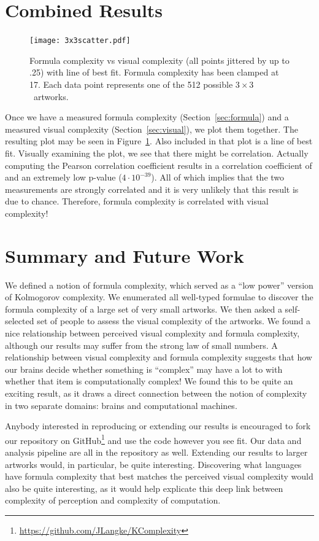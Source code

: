 \documentclass[11pt]{article}
\newcommand{\threexthree}{$3\times3$}
\begin{document}



\section{Combined Results}

\begin{figure}
\texttt{[image: 3x3scatter.pdf]}

\caption{Formula complexity vs visual complexity  (all points jittered by up to .25) with line of best fit.  Formula complexity has been clamped at 17.  Each data point represents one of the 512 possible \threexthree\ artworks.}
\label{fig:scatter}
\end{figure}

Once we have a measured formula complexity (Section~\ref{sec:formula}) and a
measured visual complexity (Section~\ref{sec:visual}), we plot them together.
The resulting plot may be seen in Figure~\ref{fig:scatter}.  Also included in
that plot is a line of best fit.  Visually examining the plot, we see that
there might be correlation.  Actually computing the Pearson correlation
coefficient results in a correlation coefficient of 
and an extremely low p-value ($4\cdot10^{-39}$).  All of which implies that the
two measurements are strongly correlated and it is very unlikely that this
result is due to chance.  Therefore, formula complexity is correlated with visual complexity! 

\section{Summary and Future Work}

We defined a notion of formula complexity, which served as a ``low power''
version of Kolmogorov complexity.  We enumerated all well-typed formulae to
discover the formula complexity of a large set of very small artworks.  We then
asked a self-selected set of people to assess the visual complexity of the
artworks.  We found a nice relationship between perceived visual complexity and
formula complexity, although our results may suffer from the strong law of
small numbers\cite{smallnumbers}.  A relationship between visual complexity and
formula complexity suggests that how our brains decide whether something is
``complex'' may have a lot to with whether that item is computationally
complex!  We found this to be quite an exciting result, as it draws a direct
connection between the notion of complexity in two separate domains: brains and
computational machines.

Anybody interested in reproducing or extending our results is encouraged to
fork our repository on
GitHub\footnote{\url{https://github.com/JLangke/KComplexity}} and use the code
however you see fit.  Our data and analysis pipeline are all in the repository
as well.  Extending our results to larger artworks would, in particular, be
quite interesting.  Discovering what languages have formula complexity that
best matches the perceived visual complexity would also be quite interesting,
as it would help explicate this deep link between complexity of perception and
complexity of computation.  

    
     
\end{document}
